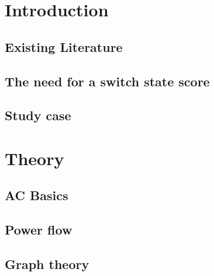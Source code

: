 \documentclass[a4paper]{report}
\begin{document}
\tableofcontents

\clearpage

\chapter{Introduction}




\section{Existing Literature}



\section{The need for a switch state score}



\section{Study case}



\chapter{Theory}


\section{AC Basics}



\section{Power flow}



\section{Graph theory}
\end{document}
